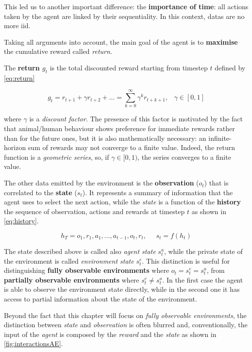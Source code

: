 This led us to another important difference: the \textbf{importance of time}: all actions taken by the agent are linked by their sequentiality. In this context, datas are no more \gls{iid}.

Taking all arguments into account, the main goal of the agent is to \textbf{maximise} the cumulative reward called \textit{return}.

The \textbf{return $g_t$} is the total discounted reward starting from timestep $t$ defined by \vref{eq:return}

\begin{equation} \label{eq:return}
	g_t = r_{t+1} + \gamma r_{t+2} + \dots = \sum_{k=0}^{\infty} \gamma^k r_{t+k+1}, \;\;\;\gamma \in [0,1]
\end{equation}

where $\gamma$ is a \textit{discount factor}. The presence of this factor is motivated by the fact that animal/human behaviour shows preference for immediate rewards rather than for the future ones, but it is also mathematically necessary: an infinite-horizon sum of rewards may not converge to a finite value. Indeed, the return function is a \textit{geometric series}, so, if $\gamma \in [0,1)$, the series converges to a finite value.


The other data emitted by the environment is the \textbf{observation} ($o_t$) that is correlated to the \textbf{state} ($s_t$). It represents a summary of information that the agent uses to select the next action, while the \textit{state} is a function of the \textbf{history} the sequence of observation, actions and rewards at timestep $t$ as shown in \vref{eq:history}.

\begin{equation}\label{eq:history}
h_T = o_1, r_1, a_1, \dots, a_{t-1}, o_{t}, r_t, \;\;\;\;\; s_t = f(h_t)
\end{equation}

The state described above is called also \textit{agent state} $s_t^a$, while the private state of the environment is called \textit{environment state} $s_t^e$. This distinction is useful for distinguishing \textbf{fully observable environments} where $o_t = s_t^e = s_t^a$, from \textbf{partially observable environments} where $s_t^e \neq s_t^a$.
In the first case the agent is able to observe the environment state directly, while in the second one it has access to partial information about the state of the environment.

Beyond the fact that this chapter will focus on \textit{fully observable environments}, the distinction between \textit{state} and \textit{observation} is often blurred and, conventionally, the input of the \textit{agent} is composed by the \textit{reward} and the \textit{state} as shown in \vref{fig:interactionsAE}.

